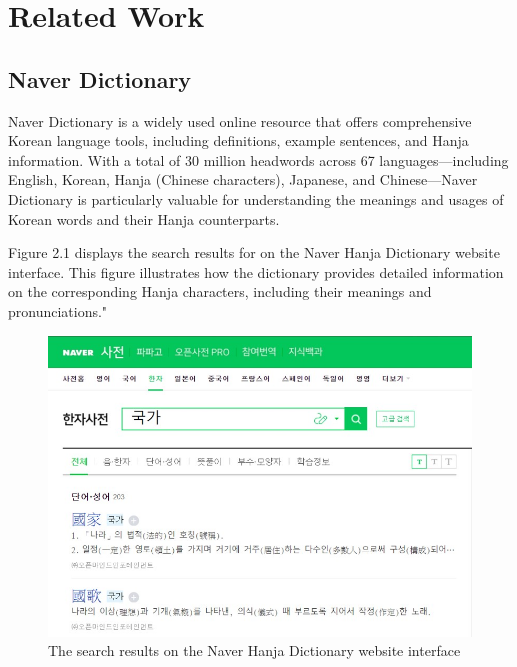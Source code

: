 \documentclass[PhD]{PHlab-thesis}
\begin{document}
\chapter{Related Work}
\section{Naver Dictionary}
Naver Dictionary\cite{NaverDictionary} is a widely used online resource that offers comprehensive Korean language tools, including definitions, example sentences, and Hanja information. With a total of 30 million headwords across 67 languages—including English, Korean, Hanja (Chinese characters), Japanese, and Chinese—Naver Dictionary is particularly valuable for understanding the meanings and usages of Korean words and their Hanja counterparts.

Figure 2.1 displays the search results for  on the Naver Hanja Dictionary website interface. This figure illustrates how the dictionary provides detailed information on the corresponding Hanja characters, including their meanings and pronunciations."

\begin{figure}[h!]
  \centering
  \includegraphics[width=\linewidth]{fig_2_1.jpg}
  \captionsetup{type=figure}
  \caption{The search results on the Naver Hanja Dictionary website interface}
  \label{fig:naver dictionary}
\end{figure}

\end{document}
